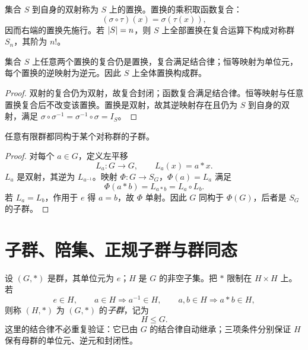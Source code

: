 \begin{definition}[置换群]\label{permutation-group}
  集合 $S$ 到自身的双射称为 $S$ 上的置换。置换的乘积取函数复合：
  \[
  (\sigma\circ\tau)(x)=\sigma(\tau(x)),
  \]
  因而右端的置换先施行。若 $\lvert S\rvert=n$，则 $S$ 上全部置换在复合运算下构成对称群 $S_n$，其阶为 $n!$。
\end{definition}

\begin{theorem}[置换在复合下成群]\label{permutation-composition}
  集合 $S$ 上任意两个置换的复合仍是置换，复合满足结合律；恒等映射为单位元，每个置换的逆映射为逆元。因此 $S$ 上全体置换构成群。
\end{theorem}

\begin{proof}
  双射的复合仍为双射，故复合封闭；函数复合满足结合律。恒等映射与任意置换复合后不改变该置换。置换是双射，故其逆映射存在且仍为 $S$ 到自身的双射，满足 $\sigma\circ\sigma^{-1}=\sigma^{-1}\circ\sigma=I_S$。
\end{proof}

\begin{theorem}[Cayley 定理]\label{cayley}
  任意有限群都同构于某个对称群的子群。
\end{theorem}

\begin{proof}
  对每个 $a\in G$，定义左平移
  \[
  L_a:G\to G,\qquad L_a(x)=a*x.
  \]
  $L_a$ 是双射，其逆为 $L_{a^{-1}}$。映射 $\Phi:G\to S_G$，$\Phi(a)=L_a$ 满足
  \[
  \Phi(a*b)=L_{a*b}=L_a\circ L_b.
  \]
  若 $L_a=L_b$，作用于 $e$ 得 $a=b$，故 $\Phi$ 单射。因此 $G$ 同构于 $\Phi(G)$，后者是 $S_G$ 的子群。
\end{proof}

\section{子群、陪集、正规子群与群同态}

\begin{definition}[子群]\label{subgroup}
  设 $(G,*)$ 是群，其单位元为 $e$；$H$ 是 $G$ 的非空子集。把 $*$ 限制在
  $H\times H$ 上。若
  \[
  e\in H,\qquad
  a\in H\Longrightarrow a^{-1}\in H,\qquad
  a,b\in H\Longrightarrow a*b\in H,
  \]
  则称 $(H,*)$ 为 $(G,*)$ 的\emph{子群}，记为
  \[
  H\le G.
  \]
  这里的结合律不必重复验证：它已由 $G$ 的结合律自动继承；三项条件分别保证
  $H$ 保有母群的单位元、逆元和封闭性。
\end{definition}

